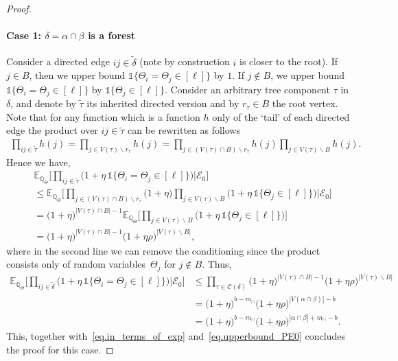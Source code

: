 \documentclass[11pt, letterpaper]{article}
\numberwithin{equation}{section}
\newcommand{\E}{\mathbb{E}}
\newcommand{\QQ}{\mathbb{Q}}
\begin{document}
\begin{proof}
\paragraph*{Case 1: $\delta= \alpha \cap \beta$ is a forest}
%
Consider a directed edge $ij \in \tilde{\delta}$ (note by construction $i$ is closer to the root). If $j \in B$, then we upper bound $\mathds{1}\{\Theta_i=\Theta_j\in[\ell]\}$ by $1$. If $j  \notin B$, we upper bound $\mathds{1}\{\Theta_i=\Theta_j\in[\ell]\}$ by $\mathds{1}\{\Theta_j \in [\ell]\}$.
Consider an arbitrary tree component $\tau$ in $\delta$, and denote by $\tilde{\tau}$ its inherited directed version and by $r_\tau\in B$ the root vertex. 
Note that for any function which is a function $h$ only of the `tail' of each directed edge the product over $ij \in \tilde{\tau}$ can be rewritten as follows
\begin{align}\label{eq.only_tails_for_trees}
\prod_{ij\in \tilde{\tau} } h(j) = \prod_{j \in V(\tau)\backslash r_{\tau}} h(j) = 
\prod_{j\in (V(\tau) \cap B) \backslash r_\tau  } h(j) \prod_{j\in V(\tau) \backslash B} h(j).
\end{align}
Hence we have,
%
\begin{align*}
&\E_{\QQ_\Theta}\Bigg[
\prod_{ij\in \tilde{\tau} } \Big(1+\eta\,\mathds{1}\{\Theta_i=\Theta_j\in[\ell]\} \Big) \Big| \mathcal E_0 \Bigg]\\
&\le \E_{\QQ_\Theta}\Bigg[\prod_{j\in (V(\tau) \cap B) \backslash r_\tau  } \Big(1+\eta \Big) \prod_{j\in V(\tau) \backslash B} \Big(1+\eta\,\mathds{1}\{\Theta_j\in[\ell]\} \Big)\Bigg| \mathcal E_0\Bigg]\\
&= \Big(1+\eta \Big)^{|V(\tau)\cap B|-1}   \E_{\QQ_\Theta}\Bigg[ \prod_{j\in V(\tau) \backslash B} \Big(1+\eta\,\mathds{1}\{\Theta_j\in[\ell]\} \Big)\Bigg]\\
&= \Big(1+\eta \Big)^{|V(\tau)\cap B|-1}   \Big(1+\eta\rho \Big)^{|V(\tau) \backslash B|},
\end{align*}
where in the second line we can remove the conditioning since the product consists only of random variables~$\Theta_j$ for $j\notin B$. 
%
%
Thus,
\begin{align*}
 \E_{\QQ_\Theta}\Bigg[
\prod_{ij\in \tilde{\delta} } \Big(1+\eta\,\mathds{1}\{\Theta_i=\Theta_j\in[\ell]\} \Big) \Big| \mathcal E_0 \Bigg]
&\le \prod_{\tau \in \mathcal{C}(\delta)} \Big(1+\eta \Big)^{|V(\tau)\cap B|-1}   \Big(1+\eta\rho \Big)^{|V(\tau) \backslash B|}\\
&= \Big(1+\eta \Big)^{b-m_\cap}   \Big(1+\eta\rho \Big)^{|V(\alpha\cap \beta)| - b}\\
&= \Big(1+\eta \Big)^{b-m_\cap}   \Big(1+\eta\rho \Big)^{|\alpha\cap \beta| + m_\cap - b}.
\end{align*}
%
%
This, together with~\eqref{eq.in_terms_of_exp} and~\eqref{eq.upperbound_PE0} concludes the proof for this case.

\end{proof}
\end{document}
